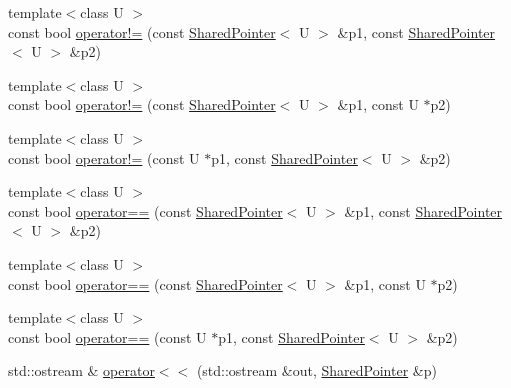 \begin{DoxyCompactItemize}
\item 
{\footnotesize template$<$class U $>$ }\\const bool \hyperlink{classprism_1_1memory_1_1_shared_pointer_a497bc2f2bc9e68da0cd9a80dc5b3b99a}{operator!=} (const \hyperlink{classprism_1_1memory_1_1_shared_pointer}{Shared\+Pointer}$<$ U $>$ \&p1, const \hyperlink{classprism_1_1memory_1_1_shared_pointer}{Shared\+Pointer}$<$ U $>$ \&p2)
\item 
{\footnotesize template$<$class U $>$ }\\const bool \hyperlink{classprism_1_1memory_1_1_shared_pointer_afa1e95ed17f645ed02ee12494d006a7b}{operator!=} (const \hyperlink{classprism_1_1memory_1_1_shared_pointer}{Shared\+Pointer}$<$ U $>$ \&p1, const U $\ast$p2)
\item 
{\footnotesize template$<$class U $>$ }\\const bool \hyperlink{classprism_1_1memory_1_1_shared_pointer_a6e788a3f86ea0f744f7f58ff0d1a6365}{operator!=} (const U $\ast$p1, const \hyperlink{classprism_1_1memory_1_1_shared_pointer}{Shared\+Pointer}$<$ U $>$ \&p2)
\item 
{\footnotesize template$<$class U $>$ }\\const bool \hyperlink{classprism_1_1memory_1_1_shared_pointer_ae1688caf7bd4dc08f775cbe830ecd6cd}{operator==} (const \hyperlink{classprism_1_1memory_1_1_shared_pointer}{Shared\+Pointer}$<$ U $>$ \&p1, const \hyperlink{classprism_1_1memory_1_1_shared_pointer}{Shared\+Pointer}$<$ U $>$ \&p2)
\item 
{\footnotesize template$<$class U $>$ }\\const bool \hyperlink{classprism_1_1memory_1_1_shared_pointer_ac396e2d37f10207b0e4da099d03ef759}{operator==} (const \hyperlink{classprism_1_1memory_1_1_shared_pointer}{Shared\+Pointer}$<$ U $>$ \&p1, const U $\ast$p2)
\item 
{\footnotesize template$<$class U $>$ }\\const bool \hyperlink{classprism_1_1memory_1_1_shared_pointer_a4001c70f47a8e58a039f8f657f8334b5}{operator==} (const U $\ast$p1, const \hyperlink{classprism_1_1memory_1_1_shared_pointer}{Shared\+Pointer}$<$ U $>$ \&p2)
\item 
std\+::ostream \& \hyperlink{classprism_1_1memory_1_1_shared_pointer_a59120dbc6c4aab96755e65df06ba2963}{operator$<$$<$} (std\+::ostream \&out, \hyperlink{classprism_1_1memory_1_1_shared_pointer}{Shared\+Pointer} \&p)
\end{DoxyCompactItemize}


